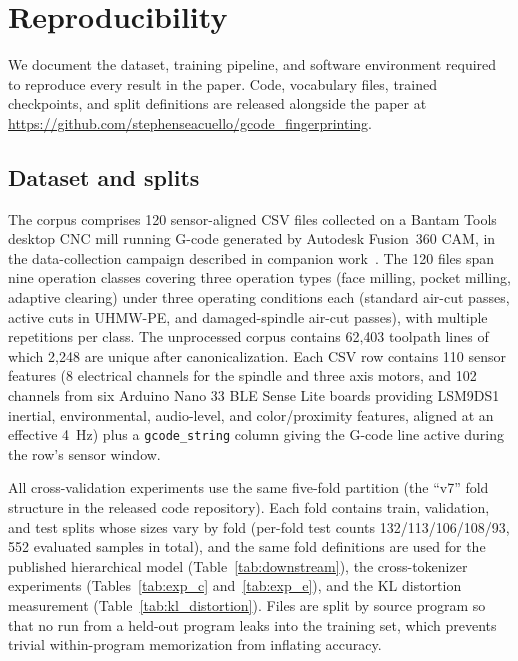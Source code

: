 \documentclass[sensors,article,submit,moreauthors,pdftex]{Definitions/mdpi}
\begin{document}
\section{Reproducibility}
\label{sec:reproducibility}

We document the dataset, training pipeline, and software environment required to reproduce every result in the paper. Code, vocabulary files, trained checkpoints, and split definitions are released alongside the paper at \url{https://github.com/stephenseacuello/gcode\_fingerprinting}.

\subsection{Dataset and splits}
\label{sec:repro_data}

The corpus comprises 120 sensor-aligned CSV files collected on a Bantam Tools desktop CNC mill running G-code generated by Autodesk Fusion~360 CAM, in the data-collection campaign described in companion work~\cite{encoder_paper}. The 120 files span nine operation classes covering three operation types (face milling, pocket milling, adaptive clearing) under three operating conditions each (standard air-cut passes, active cuts in UHMW-PE, and damaged-spindle air-cut passes), with multiple repetitions per class. The unprocessed corpus contains 62{,}403 toolpath lines of which 2{,}248 are unique after canonicalization. Each CSV row contains 110 sensor features (8 electrical channels for the spindle and three axis motors, and 102 channels from six Arduino Nano 33 BLE Sense Lite boards providing LSM9DS1 inertial, environmental, audio-level, and color/proximity features, aligned at an effective 4~Hz) plus a \texttt{gcode\_string} column giving the G-code line active during the row's sensor window.

All cross-validation experiments use the same five-fold partition (the ``v7'' fold structure in the released code repository). Each fold contains train, validation, and test splits whose sizes vary by fold (per-fold test counts 132/113/106/108/93, 552 evaluated samples in total), and the same fold definitions are used for the published hierarchical model (Table~\ref{tab:downstream}), the cross-tokenizer experiments (Tables~\ref{tab:exp_c} and~\ref{tab:exp_e}), and the KL distortion measurement (Table~\ref{tab:kl_distortion}). Files are split by source program so that no run from a held-out program leaks into the training set, which prevents trivial within-program memorization from inflating accuracy.
\end{document}
